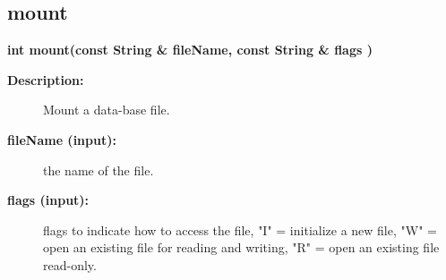 \subsection{mount}
 
\begin{flushleft} \textbf{%
\settowidth{\ADataBaseIncludeArgIndent}{int  mount(}%
int  mount(const String \& fileName, const String \& flags )
}\end{flushleft}
\begin{description}
\item[{\bf Description:}] 
   Mount a data-base file.
\item[{\bf fileName (input):}]  the name of the file.
\item[{\bf flags (input):}]  flags to indicate how to access the file, "I" = initialize
   a new file, "W" = open an existing file for reading and writing,
   "R" = open an existing file read-only.
\end{description}

